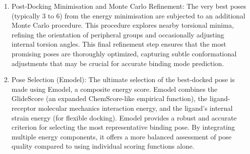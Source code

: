 \documentclass[11pt]{article}
\begin{document}
\begin{enumerate}
    \item Post-Docking Minimisation and Monte Carlo Refinement: The very best poses (typically 3 to 6) from the energy minimisation are subjected to an additional Monte Carlo procedure. This procedure explores nearby torsional minima, refining the orientation of peripheral groups and occasionally adjusting internal torsion angles. This final refinement step ensures that the most promising poses are thoroughly optimized, capturing subtle conformational adjustments that may be crucial for accurate binding mode prediction.

    \item Pose Selection (Emodel): The ultimate selection of the best-docked pose is made using Emodel, a composite energy score. Emodel combines the GlideScore (an expanded ChemScore-like empirical function), the ligand-receptor molecular mechanics interaction energy, and the ligand's internal strain energy (for flexible docking). Emodel provides a robust and accurate criterion for selecting the most representative binding pose. By integrating multiple energy components, it offers a more balanced assessment of pose quality compared to using individual scoring functions alone.

\end{enumerate}
\end{document}
